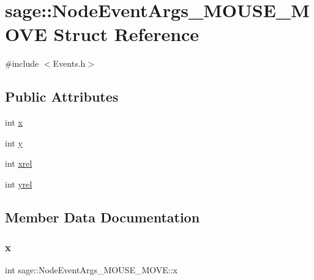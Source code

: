 \hypertarget{structsage_1_1NodeEventArgs__MOUSE__MOVE}{}\section{sage\+::Node\+Event\+Args\+\_\+\+M\+O\+U\+S\+E\+\_\+\+M\+O\+VE Struct Reference}
\label{structsage_1_1NodeEventArgs__MOUSE__MOVE}


{\ttfamily \#include $<$Events.\+h$>$}

\subsection*{Public Attributes}
\begin{DoxyCompactItemize}
\item 
int \mbox{\hyperlink{structsage_1_1NodeEventArgs__MOUSE__MOVE_a1ad1468e52aa33a5dc7c7f1cd14547e4}{x}}
\item 
int \mbox{\hyperlink{structsage_1_1NodeEventArgs__MOUSE__MOVE_a5af30db299bd9913605188f2d2c818b1}{y}}
\item 
int \mbox{\hyperlink{structsage_1_1NodeEventArgs__MOUSE__MOVE_a38d342592cda91c9edea89fd50a5426e}{xrel}}
\item 
int \mbox{\hyperlink{structsage_1_1NodeEventArgs__MOUSE__MOVE_a9617be59ee2a310a137406ee7be8b783}{yrel}}
\end{DoxyCompactItemize}


\subsection{Member Data Documentation}
\mbox{\label{structsage_1_1NodeEventArgs__MOUSE__MOVE_a1ad1468e52aa33a5dc7c7f1cd14547e4}} 
\subsubsection{\texorpdfstring{x}{x}}
{\footnotesize\ttfamily int sage\+::\+Node\+Event\+Args\+\_\+\+M\+O\+U\+S\+E\+\_\+\+M\+O\+V\+E\+::x}

\mbox{\label{structsage_1_1NodeEventArgs__MOUSE__MOVE_a38d342592cda91c9edea89fd50a5426e}} 
